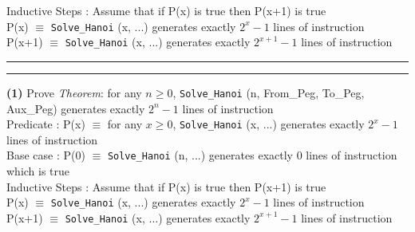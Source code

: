 \documentclass[a4paper, 11pt]{article}
\newcommand{\question}[2] {\vspace{.25in} \hrule\vspace{0.5em}
	\noindent{\bf #1: #2} \vspace{0.5em}
	\hrule \vspace{.10in}}
\renewcommand{\part}[1] {\vspace{.10in} {\bf (#1)}}
\begin{document}
	Inductive Steps : Assume that if P(x) is true then P(x+1) is true\\
	P(x)  $\equiv$ \texttt{Solve\_Hanoi} (x, ...) generates exactly $2^x-1$ lines of instruction\\
	P(x+1)  $\equiv$ \texttt{Solve\_Hanoi} (x, ...) generates exactly $2^{x+1}-1$ lines of instruction\\ %
	
	\question{7}{Digit Sum}
	\part{1} Prove {\em Theorem}:
	for any $n \geq 0$, \texttt{Solve\_Hanoi} (n, {From\_Peg}, {To\_Peg}, {Aux\_Peg}) generates exactly $2^n-1$ lines of instruction\\
	
	Predicate : P(x) $\equiv$ for any $x \geq 0$, \texttt{Solve\_Hanoi} (x, ...) generates exactly $2^x-1$ lines of instruction\\
	
	Base case : P(0) $\equiv$ \texttt{Solve\_Hanoi} (n, ...) generates exactly 0 lines of instruction which is true\\
	
	Inductive Steps : Assume that if P(x) is true then P(x+1) is true\\
	P(x)  $\equiv$ \texttt{Solve\_Hanoi} (x, ...) generates exactly $2^x-1$ lines of instruction\\
	P(x+1)  $\equiv$ \texttt{Solve\_Hanoi} (x, ...) generates exactly $2^{x+1}-1$ lines of instruction\\ %
\end{document}
